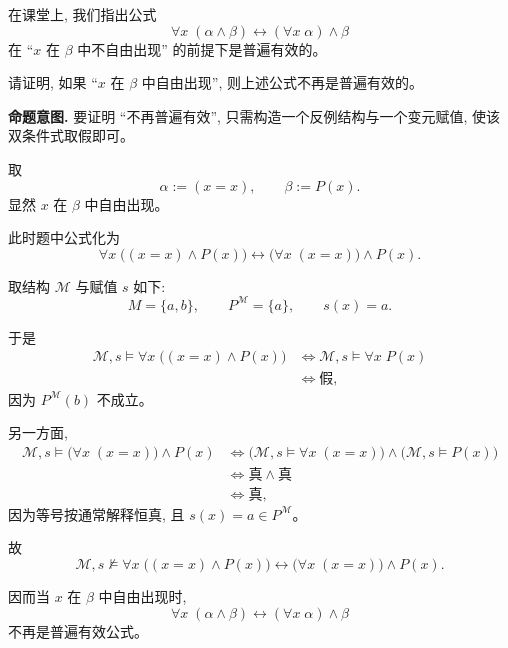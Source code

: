\documentclass[a4paper, justified]{tufte-handout}
\newenvironment{intention}
  {\par\smallskip\noindent\textbf{命题意图. }\ignorespaces}
  {\par\smallskip}
\begin{document}
\newpage
\begin{problem}
  在课堂上, 我们指出公式
  \[
    \forall x\; (\alpha \land \beta)
      \leftrightarrow (\forall x\; \alpha) \land \beta
  \]
  在 ``$x$ 在 $\beta$ 中不自由出现'' 的前提下是普遍有效的。

  \noindent 请证明, 如果 ``$x$ 在 $\beta$ 中自由出现'',
  则上述公式不再是普遍有效的。
\end{problem}

\begin{solution}
  \begin{intention}
    要证明 ``不再普遍有效'', 只需构造一个反例结构与一个变元赋值, 使该双条件式取假即可。
  \end{intention}

  取
  \[
    \alpha := (x = x),
    \qquad
    \beta := P(x).
  \]
  显然 $x$ 在 $\beta$ 中自由出现。

  此时题中公式化为
  \[
    \forall x\; \big((x = x) \land P(x)\big)
      \leftrightarrow
      \big(\forall x\; (x = x)\big) \land P(x).
  \]

  取结构 $\mathcal M$ 与赋值 $s$ 如下:
  \[
    M = \{a, b\},
    \qquad
    P^{\mathcal M} = \{a\},
    \qquad
    s(x) = a.
  \]

  于是
  \begin{align*}
    \mathcal M, s \models \forall x\; \big((x = x) \land P(x)\big)
      &\iff \mathcal M, s \models \forall x\; P(x) \\
      &\iff \text{假},
  \end{align*}
  因为 $P^{\mathcal M}(b)$ 不成立。

  另一方面,
  \begin{align*}
    \mathcal M, s \models \big(\forall x\; (x = x)\big) \land P(x)
      &\iff \big(\mathcal M, s \models \forall x\; (x = x)\big)
          \land \big(\mathcal M, s \models P(x)\big) \\
      &\iff \text{真} \land \text{真} \\
      &\iff \text{真},
  \end{align*}
  因为等号按通常解释恒真, 且 $s(x) = a \in P^{\mathcal M}$。

  故
  \[
    \mathcal M, s \not\models
    \forall x\; \big((x = x) \land P(x)\big)
      \leftrightarrow
      \big(\forall x\; (x = x)\big) \land P(x).
  \]

  因而当 $x$ 在 $\beta$ 中自由出现时,
  \[
    \forall x\; (\alpha \land \beta)
      \leftrightarrow (\forall x\; \alpha) \land \beta
  \]
  不再是普遍有效公式。


\end{solution}
\end{document}
